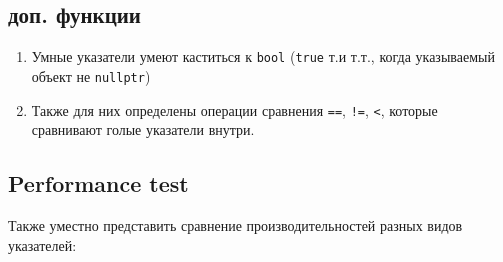 \subsection{доп. функции}
\begin{enumerate}
\item Умные указатели умеют каститься к \texttt{bool} (\texttt{true} т.и т.т., когда указываемый объект не \texttt{nullptr})
\item  Также для них определены операции сравнения \texttt{==}, \texttt{!=}, \texttt{<}, которые сравнивают голые указатели внутри.
\end{enumerate}

\subsection{Performance test}

Также уместно представить сравнение производительностей разных видов указателей:

